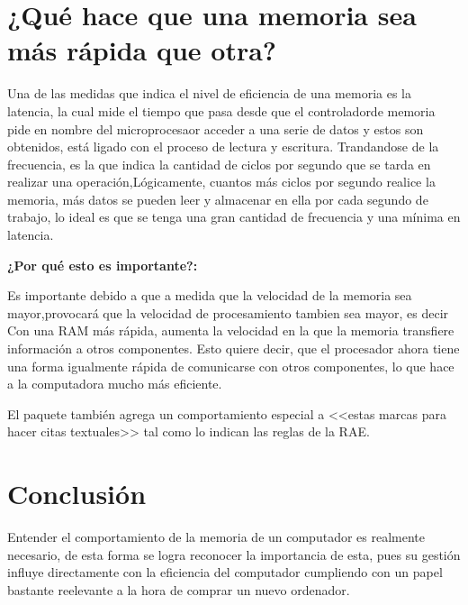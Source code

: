 \documentclass{article}
\begin{document}
\section{¿Qué hace que una memoria sea más rápida que otra?} \label{contenido}


Una de las medidas que indica el nivel de eficiencia de una memoria es la latencia, la cual mide el tiempo que pasa desde que el controladorde memoria pide en nombre del microprocesaor acceder a una serie de datos y estos son obtenidos, está ligado con el proceso de lectura y escritura.
Trandandose de la frecuencia, es la que  indica la cantidad de ciclos por segundo que se tarda en realizar una operación,Lógicamente, cuantos más ciclos por segundo realice la memoria, más datos se pueden leer y almacenar
en ella por cada segundo de trabajo, lo ideal es  que se tenga una gran cantidad de frecuencia y una mínima en latencia.



\textbf{¿Por qué esto es importante?:}

Es importante debido a que a medida que la velocidad de la memoria sea mayor,provocará que la velocidad de procesamiento tambien sea mayor, es decir
Con una RAM más rápida, aumenta la velocidad en la que la memoria transfiere información a otros componentes. Esto quiere decir, que el procesador ahora tiene una forma igualmente rápida de comunicarse con otros componentes, lo que hace a la computadora mucho más eficiente.

El paquete también agrega un comportamiento especial 
a <<estas marcas para hacer citas textuales>> tal como 
lo indican las reglas de la RAE. \cite{memoria}
\cite{knuthwebsite}


\section{Conclusión} \label{conclulsion}

Entender el comportamiento de la memoria de un computador es realmente necesario, de esta forma se logra reconocer la importancia de esta, pues su gestión influye directamente con la eficiencia del computador cumpliendo con un papel bastante reelevante a la hora de comprar un nuevo ordenador.  



\end{document}
